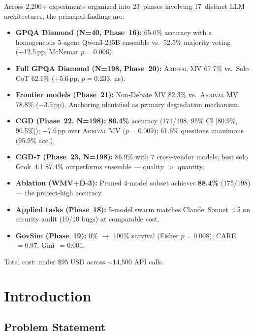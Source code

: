 \documentclass[11pt,a4paper]{article}
\newcommand{\arrival}{\textsc{Arrival}\xspace}
\newcommand{\pp}{\,pp\xspace}
\begin{document}
Across 2,200+ experiments organized into 23~phases involving
17~distinct LLM architectures, the principal findings are:

\begin{itemize}
  \item \textbf{GPQA Diamond (N=40, Phase~16):}
        65.0\% accuracy with a homogeneous 5-agent Qwen3-235B ensemble
        vs.\ 52.5\% majority voting (+12.5\pp, McNemar $p=0.006$).
  \item \textbf{Full GPQA Diamond (N=198, Phase~20):}
        \arrival MV 67.7\% vs.\ Solo CoT 62.1\% (+5.6\pp,
        $p=0.233$, ns).
  \item \textbf{Frontier models (Phase~21):}
        Non-Debate MV 82.3\% vs.\ \arrival MV 78.8\% ($-3.5$\pp).
        Anchoring identified as primary degradation mechanism.
  \item \textbf{CGD (Phase~22, N=198):}
        \textbf{86.4\%} accuracy (171/198, 95\% CI [80.9\%, 90.5\%]);
        +7.6\pp over \arrival MV ($p=0.009$);
        61.6\% questions unanimous (95.9\% acc.).
  \item \textbf{CGD-7 (Phase~23, N=198):}
        86.9\% with 7 cross-vendor models; best solo Grok~4.1 87.4\%
        outperforms ensemble — quality $>$ quantity.
  \item \textbf{Ablation (WMV+D-3):}
        Pruned 4-model subset achieves \textbf{88.4\%} (175/198) —
        the project-high accuracy.
  \item \textbf{Applied tasks (Phase~18):}
        5-model swarm matches Claude~Sonnet~4.5 on security audit
        (10/10 bugs) at comparable cost.
  \item \textbf{GovSim (Phase~19):}
        0\% $\to$ 100\% survival (Fisher $p=0.008$); CARE~$=0.97$,
        Gini~$=0.001$.
\end{itemize}

Total cost: under \$95 USD across $\sim$14,500 API calls.

\section{Introduction}\label{sec:intro}

\subsection{Problem Statement}
\end{document}
